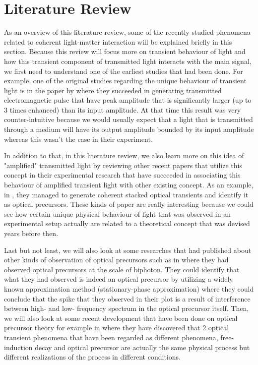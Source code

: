 \chapter{Literature Review}
As an overview of this literature review, some of the recently studied phenomena related to coherent light-matter interaction will be explained briefly in this section. Because this review will focus more on transient behaviour of light and how this transient component of transmitted light interacts with the main signal, we first need to understand one of the earliest studies that had been done. For example, one of the original studies regarding the unique behaviour of transient light is in the paper by  where they succeeded in generating transmitted electromagnetic pulse that have peak amplitude that is significantly larger (up to 3 times enhanced) than its input amplitude. At that time this result was very counter-intuitive because we would usually expect that a light that is transmitted through a medium will have its output amplitude bounded by its input amplitude whereas this wasn't the case in their experiment.

In addition to that, in this literature review, we also learn more on this idea of "amplified" transmitted light by reviewing other recent papers that utilize this concept in their experimental research that have succeeded in associating this behaviour of amplified transient light with other existing concept. As an example, in , they managed to generate coherent stacked optical transients and identify it as optical precursors. These kinds of paper are really interesting because we could see how certain unique physical behaviour of light that was observed in an experimental setup actually are related to a theoretical concept that was devised years before then.

Last but not least, we will also look at some researches that had published about other kinds of observation of optical precursors such as in  where they had observed optical precursors at the scale of biphoton. They could identify that what they had observed is indeed an optical precursor by utilizing a widely known approximation method (stationary-phase approximation) where they could conclude that the spike that they observed in their plot is a result of interference between high- and low- frequency spectrum in the optical precursor itself. Then, we will also look at some recent development that have been done on optical precursor theory for example in  where they have discovered that 2 optical transient phenomena that have been regarded as different phenomena, free-induction decay and optical precursor are actually the same physical process  but different realizations of the process in different conditions.

